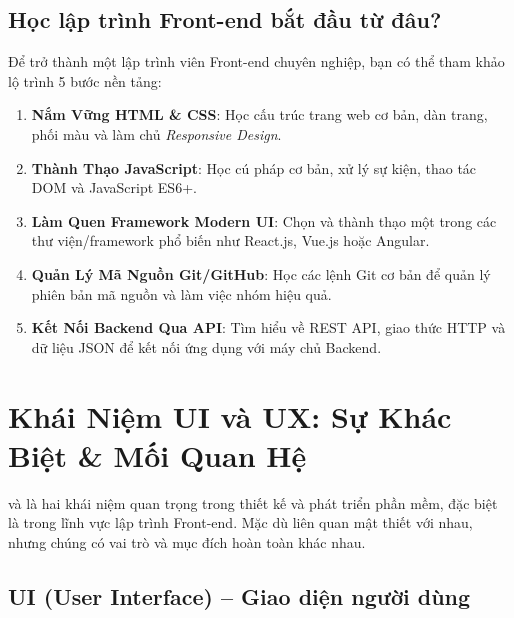 \subsection{Học lập trình Front-end bắt đầu từ đâu?}

Để trở thành một lập trình viên Front-end chuyên nghiệp, bạn có thể tham khảo lộ trình 5 bước nền tảng:
\begin{conceptBox}
\begin{enumerate}[label=\textbf{\color{conceptBorder}Bước \arabic*:}, leftmargin=4.8em, itemsep=3pt, parsep=0pt, topsep=4pt]
    \item \textbf{Nắm Vững HTML \& CSS}: Học cấu trúc trang web cơ bản, dàn trang, phối màu và làm chủ \textit{Responsive Design}.
    \item \textbf{Thành Thạo JavaScript}: Học cú pháp cơ bản, xử lý sự kiện, thao tác DOM và JavaScript ES6+.
    \item \textbf{Làm Quen Framework Modern UI}: Chọn và thành thạo một trong các thư viện/framework phổ biến như React.js, Vue.js hoặc Angular.
    \item \textbf{Quản Lý Mã Nguồn Git/GitHub}: Học các lệnh Git cơ bản để quản lý phiên bản mã nguồn và làm việc nhóm hiệu quả.
    \item \textbf{Kết Nối Backend Qua API}: Tìm hiểu về REST API, giao thức HTTP và dữ liệu JSON để kết nối ứng dụng với máy chủ Backend.
\end{enumerate}
\end{conceptBox}

\section{Khái Niệm UI và UX: Sự Khác Biệt \& Mối Quan Hệ}
\label{sec:ui_ux_concepts}

 và  là hai khái niệm quan trọng trong thiết kế và phát triển phần mềm, đặc biệt là trong lĩnh vực lập trình Front-end. Mặc dù liên quan mật thiết với nhau, nhưng chúng có vai trò và mục đích hoàn toàn khác nhau.

\subsection{UI (User Interface) -- Giao diện người dùng}

